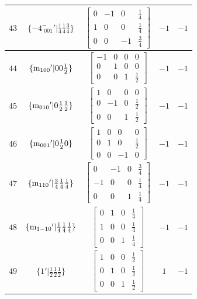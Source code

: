 \documentclass[fleqn,8pt]{jsarticle}
\begin{document}
\begin{longtable}{ccccc}
$ 43 $ & $ \{-4^{-}_{\,\,001}{}'|\frac{1}{4} \frac{1}{4} \frac{3}{4}\} $ & $ \begin{bmatrix} 0 & -1 & 0 & \frac{1}{4} \\ 1 & 0 & 0 & \frac{1}{4} \\ 0 & 0 & -1 & \frac{3}{4} \end{bmatrix} $ & $ -1 $ & $ -1 $ \\ \hline
$ 44 $ & $ \{{\rm m}_{100}{}'|0 0 \frac{1}{2}\} $ & $ \begin{bmatrix} -1 & 0 & 0 & 0 \\ 0 & 1 & 0 & 0 \\ 0 & 0 & 1 & \frac{1}{2} \end{bmatrix} $ & $ -1 $ & $ -1 $ \\ \hline
$ 45 $ & $ \{{\rm m}_{010}{}'|0 \frac{1}{2} \frac{1}{2}\} $ & $ \begin{bmatrix} 1 & 0 & 0 & 0 \\ 0 & -1 & 0 & \frac{1}{2} \\ 0 & 0 & 1 & \frac{1}{2} \end{bmatrix} $ & $ -1 $ & $ -1 $ \\ \hline
$ 46 $ & $ \{{\rm m}_{001}{}'|0 \frac{1}{2} 0\} $ & $ \begin{bmatrix} 1 & 0 & 0 & 0 \\ 0 & 1 & 0 & \frac{1}{2} \\ 0 & 0 & -1 & 0 \end{bmatrix} $ & $ -1 $ & $ -1 $ \\ \hline
$ 47 $ & $ \{{\rm m}_{110}{}'|\frac{3}{4} \frac{1}{4} \frac{1}{4}\} $ & $ \begin{bmatrix} 0 & -1 & 0 & \frac{3}{4} \\ -1 & 0 & 0 & \frac{1}{4} \\ 0 & 0 & 1 & \frac{1}{4} \end{bmatrix} $ & $ -1 $ & $ -1 $ \\ \hline
$ 48 $ & $ \{{\rm m}_{1-10}{}'|\frac{1}{4} \frac{1}{4} \frac{1}{4}\} $ & $ \begin{bmatrix} 0 & 1 & 0 & \frac{1}{4} \\ 1 & 0 & 0 & \frac{1}{4} \\ 0 & 0 & 1 & \frac{1}{4} \end{bmatrix} $ & $ -1 $ & $ -1 $ \\ \hline
$ 49 $ & $ \{1{}'|\frac{1}{2} \frac{1}{2} \frac{1}{2}\} $ & $ \begin{bmatrix} 1 & 0 & 0 & \frac{1}{2} \\ 0 & 1 & 0 & \frac{1}{2} \\ 0 & 0 & 1 & \frac{1}{2} \end{bmatrix} $ & $ 1 $ & $ -1 $ \\ \hline

\end{longtable}
\end{document}
